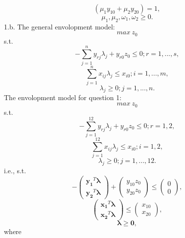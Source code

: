 \documentclass{article}
\begin{document}
$$ (\mu_1 y_{10} + \mu_2 y_{20}) = 1, $$
$$ \mu_1, \mu_2, \omega_1, \omega_2 \geq 0. $$
1.b.
The general envolopment model:
$$ max\ z_0 $$
s.t.
$$ - \sum_{j = 1}^n y_{rj} \lambda_j + y_{r0} z_0 \leq 0; r = 1, ..., s, $$
$$ \sum_{j=1}^n x_{ij} \lambda_j \leq x_{i0}; i = 1, ..., m, $$
$$ \lambda_j \geq 0; j = 1, ..., n. $$
The envolopment model for question 1:
$$ max\ z_0 $$
s.t.
$$ - \sum_{j = 1}^{12} y_{rj} \lambda_j + y_{r0} z_0 \leq 0; r = 1, 2, $$
$$ \sum_{j=1}^{12} x_{ij} \lambda_j \leq x_{i0}; i = 1, 2, $$
$$ \lambda_j \geq 0; j = 1, ..., 12. $$
i.e., s.t.
$$
-
\begin{pmatrix}
  \boldsymbol{y_1}^T \boldsymbol{\lambda} \\
  \boldsymbol{y_2}^T \boldsymbol{\lambda}
\end{pmatrix}
+
\begin{pmatrix}
  y_{10} z_0 \\
  y_{20} z_0
\end{pmatrix}
\leq
\begin{pmatrix}
  0 \\
  0
\end{pmatrix},
$$
$$
\begin{pmatrix}
  \boldsymbol{x_1}^T \boldsymbol{\lambda} \\
  \boldsymbol{x_2}^T \boldsymbol{\lambda}
\end{pmatrix}
\leq
\begin{pmatrix}
  x_{10} \\
  x_{20} 
\end{pmatrix},
$$
$$ \boldsymbol{\lambda} \geq \boldsymbol{0}, $$
where
\end{document}
